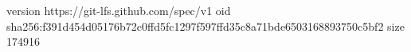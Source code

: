 version https://git-lfs.github.com/spec/v1
oid sha256:f391d454d05176b72c0ffd5fc1297f597ffd35c8a71bde6503168893750c5bf2
size 174916

